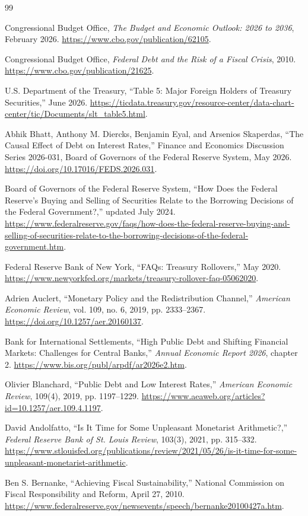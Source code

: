\documentclass[11pt]{article}
\begin{document}
\begin{thebibliography}{99}

Congressional Budget Office, \emph{The Budget and Economic Outlook: 2026 to 2036},
February 2026.  \url{https://www.cbo.gov/publication/62105}.

Congressional Budget Office, \emph{Federal Debt and the Risk of a Fiscal Crisis}, 2010.
\url{https://www.cbo.gov/publication/21625}.

U.S. Department of the Treasury, ``Table 5: Major Foreign Holders of Treasury Securities,''
June 2026.  \url{https://ticdata.treasury.gov/resource-center/data-chart-center/tic/Documents/slt_table5.html}.

Abhik Bhatt, Anthony M. Diercks, Benjamin Eyal, and Arsenios Skaperdas, ``The Causal Effect
of Debt on Interest Rates,'' Finance and Economics Discussion Series 2026-031, Board of
Governors of the Federal Reserve System, May 2026.
\url{https://doi.org/10.17016/FEDS.2026.031}.

Board of Governors of the Federal Reserve System, ``How Does the Federal Reserve's Buying
and Selling of Securities Relate to the Borrowing Decisions of the Federal Government?,''
updated July 2024.
\url{https://www.federalreserve.gov/faqs/how-does-the-federal-reserve-buying-and-selling-of-securities-relate-to-the-borrowing-decisions-of-the-federal-government.htm}.

Federal Reserve Bank of New York, ``FAQs: Treasury Rollovers,'' May 2020.
\url{https://www.newyorkfed.org/markets/treasury-rollover-faq-05062020}.

Adrien Auclert, ``Monetary Policy and the Redistribution Channel,'' \emph{American Economic
Review}, vol. 109, no. 6, 2019, pp. 2333--2367.
\url{https://doi.org/10.1257/aer.20160137}.

Bank for International Settlements, ``High Public Debt and Shifting Financial Markets:
Challenges for Central Banks,'' \emph{Annual Economic Report 2026}, chapter 2.
\url{https://www.bis.org/publ/arpdf/ar2026e2.htm}.

Olivier Blanchard, ``Public Debt and Low Interest Rates,'' \emph{American Economic Review},
109(4), 2019, pp. 1197--1229.
\url{https://www.aeaweb.org/articles?id=10.1257/aer.109.4.1197}.

David Andolfatto, ``Is It Time for Some Unpleasant Monetarist Arithmetic?,''
\emph{Federal Reserve Bank of St. Louis Review}, 103(3), 2021, pp. 315--332.
\url{https://www.stlouisfed.org/publications/review/2021/05/26/is-it-time-for-some-unpleasant-monetarist-arithmetic}.

Ben S. Bernanke, ``Achieving Fiscal Sustainability,'' National Commission on Fiscal
Responsibility and Reform, April 27, 2010.
\url{https://www.federalreserve.gov/newsevents/speech/bernanke20100427a.htm}.

\end{thebibliography}
\end{document}
